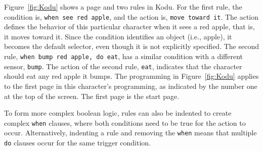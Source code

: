 \documentclass[conference]{IEEEtran}
\newcommand{\todo}[1]{\textbf{#1}}
\begin{document}
Figure~\ref{fig:Kodu} shows a page and two rules  in Kodu. For the first rule, the condition is, {\tt when see red apple}, and the action is, {\tt move toward it}. The action defines the behavior of this particular character when it sees a red apple, that is, it moves toward it. Since the condition identifies an object (i.e., apple), it becomes the default selector, even though it is not explicitly specified. The second rule, {\tt when bump red apple, do eat}, has a similar condition with a different sensor, {\tt bump}. The action of the second rule, {\tt eat}, indicates that the character should eat any red apple it bumps. 
The programming in Figure~\ref{fig:Kodu} applies to the first page in this character's programming, as indicated by the number one at the top of the screen. The first page is the  start page.

To form more complex boolean logic, rules can also be indented to create complex {\tt when} clauses, where both conditions need to be true for the action to occur. Alternatively, indenting a rule and removing the {\tt when} means that multiple {\tt do} clauses occur for the same trigger condition. 



\end{document}
